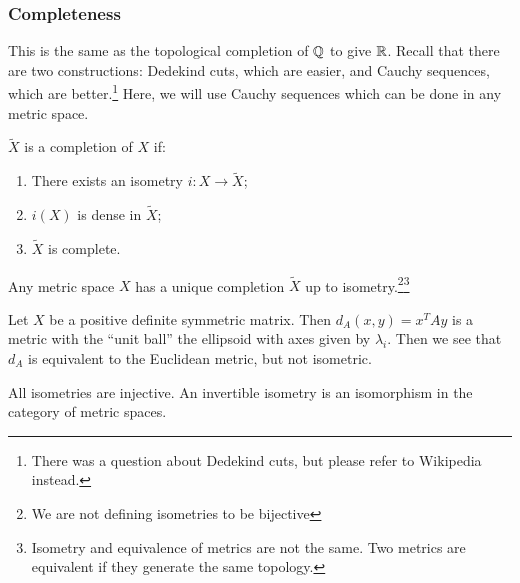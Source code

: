 \documentclass[10pt, twoside]{article}
\begin{document}
    \subsubsection{Completeness}
    This is the same as the topological completion of $\mathbb{Q}$ to give $\mathbb{R}$. Recall that there are two constructions: Dedekind cuts, which are easier, and Cauchy sequences, which are better.\footnote{There was a question about Dedekind cuts, but please refer to Wikipedia instead.} Here, we will use Cauchy sequences which can be done in any metric space.

    \begin{defn}
        $\tilde{X}$ is a completion of $X$ if:
        \begin{enumerate}
            \item There exists an isometry $i: X \rightarrow \tilde{X}$;
            \item $i(X)$ is dense in $\tilde{X}$;
            \item $\tilde{X}$ is complete.
        \end{enumerate}
    \end{defn}

    \begin{thm}
        Any metric space $X$ has a unique completion $\tilde{X}$ up to isometry.\footnote{We are not defining isometries to be bijective}\footnote{Isometry and equivalence of metrics are not the same. Two metrics are equivalent if they generate the same topology.}
    \end{thm}

    \begin{exm}
        Let $X$ be a positive definite symmetric matrix. Then $d_A(x,y) = x^TAy$ is a metric with the ``unit ball'' the ellipsoid with axes given by $\lambda_i$. Then we see that $d_A$ is equivalent to the Euclidean metric, but not isometric.
    \end{exm}

    \begin{rmk}
        All isometries are injective. An invertible isometry is an isomorphism in the category of metric spaces.
    \end{rmk}
\end{document}
